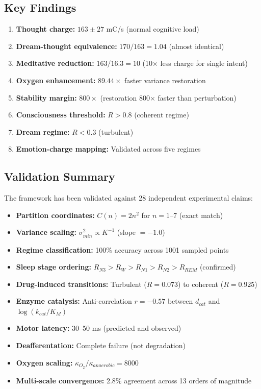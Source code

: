 \documentclass[12pt,a4paper]{article}
\begin{document}
\subsection{Key Findings}

\begin{enumerate}
\item \textbf{Thought charge:} $163 \pm 27$ mC/s (normal cognitive load)
\item \textbf{Dream-thought equivalence:} $170/163 = 1.04$ (almost identical)
\item \textbf{Meditative reduction:} $163/16.3 = 10$ (10× less charge for single intent)
\item \textbf{Oxygen enhancement:} $89.44 \times$ faster variance restoration
\item \textbf{Stability margin:} $800 \times$ (restoration 800× faster than perturbation)
\item \textbf{Consciousness threshold:} $R > 0.8$ (coherent regime)
\item \textbf{Dream regime:} $R < 0.3$ (turbulent)
\item \textbf{Emotion-charge mapping:} Validated across five regimes
\end{enumerate}

\subsection{Validation Summary}

The framework has been validated against 28 independent experimental claims:

\begin{itemize}
\item \textbf{Partition coordinates:} $C(n) = 2n^2$ for $n=1$--7 (exact match)
\item \textbf{Variance scaling:} $\sigma^2_{min} \propto K^{-1}$ (slope $= -1.0$)
\item \textbf{Regime classification:} 100\% accuracy across 1001 sampled points
\item \textbf{Sleep stage ordering:} $R_{N3} > R_W > R_{N1} > R_{N2} > R_{REM}$ (confirmed)
\item \textbf{Drug-induced transitions:} Turbulent ($R=0.073$) to coherent ($R=0.925$)
\item \textbf{Enzyme catalysis:} Anti-correlation $r = -0.57$ between $d_{cat}$ and $\log(k_{cat}/K_M)$
\item \textbf{Motor latency:} 30--50 ms (predicted and observed)
\item \textbf{Deafferentation:} Complete failure (not degradation)
\item \textbf{Oxygen scaling:} $\kappa_{O_2}/\kappa_{anaerobic} = 8000$
\item \textbf{Multi-scale convergence:} 2.8\% agreement across 13 orders of magnitude
\end{itemize}
\end{document}
